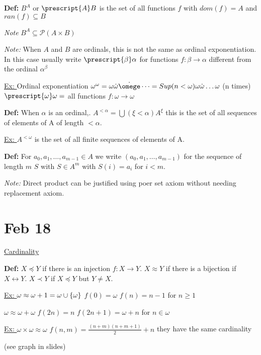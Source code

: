 \documentclass{article}
\newcommand{\defn}{\textbf{Def: }}
\begin{document}
    \textbf{Def:} $B^A$ or $\prescript{A}B$ is the set of all functions $f$ with $dom(f) = A$ and $ran(f) \subseteq B$

    \emph{Note} $B^A \subseteq \mathcal{P}(A \times B)$

    \emph{Note: } When $A$ and $B$ are ordinals, this is not the same as ordinal exponentiation.
    In this case usually write $\prescript{\beta}\alpha$ for functions $f : \beta \rightarrow \alpha$ different from the ordinal $\alpha^{\beta}$

    \underline{Ex: } Ordinal exponentiation $\omega^{\omega} = \omega \dot \omega \dot \omege \dots = Sup(n < \omega) \omega \dot \omega \dots \omega$ (n times)
    $\prescript{\omega}\omega = $ all functions $f : \omega \rightarrow \omega$

    \textbf{Def:} When $\alpha$ is an ordinal,. $A^{<\alpha} = \bigcup(\xi < \alpha) A^{\xi}$
    this is the set of all sequences of elements of A of length $<\alpha$.

    \underline{Ex: } $A^{<\omega}$ is the set of all finite sequences of elements of A.

    \textbf{Def: } For $a_0,a_1,\dots,a_{m-1} \in A$ we write $(a_0,a_1,\dots,a_{m-1})$ for the sequence of length $m$ $S$ with $S \in A^m$ with $S(i) = a_i$ for $i<m$.

    \emph{Note: } Direct product can be justified using poer set axiom without needing replacement axiom.


    \section{Feb 18}

    \underline{Cardinality}

    \defn $X \preceq Y$ if there is an injection $f: X \rightarrow Y$.
    $X \approx Y$ if there is a bijection if $X \leftrightarrow Y$.
    $X \prec Y$ if $X \preceq Y$ but $Y \neq X$.

    \underline{Ex: } $\omega \approx \omega + 1 = \omega \cup \{\omega\}$
    $f(0) = \omega$
    $f(n) = n-1$ for $n \geq 1$

     $\omega \approx \omega + \omega$
    $f(2n) = n$
    $f(2n +1) = \omega + n$ for $n \in \omega$

    \underline{Ex: } $\omega \times \omega \approx \omega$
    $f(n,m) = \frac{(n+m)(n+m+1)}{2} + n$
    they have the same cardinality

    (see graph in slides)
\end{document}
